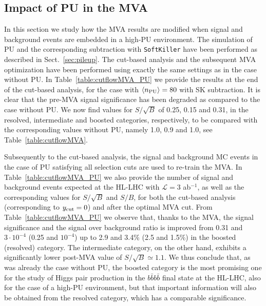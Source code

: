 \subsection{Impact of PU in the MVA}

In this section we study how the MVA results are modified when
signal and background events are embedded in a high-PU environment.
%
The simulation of PU and the corresponding subtraction with
{\tt SoftKiller} have been performed as described
in Sect.~\ref{sec:pileup}.
%
The cut-based analysis and the subsequent
MVA optimization have been performed using exactly the same
settings as in the case without PU.
%
In Table~\ref{table:cutflowMVA_PU} we provide the results
  at the end of the cut-based analysis,
  for the case with $\left\langle n_{\rm PU}\right\rangle=80$ with SK
  subtraction.
%
It is clear that the pre-MVA 
signal significance has been degraded
as compared to the case without PU.
%
We now find values for $S/\sqrt{B}$ of 0.25, 0.15 and 0.31, in the resolved,
intermediate and boosted categories, respectively, to be compared
with the corresponding values without PU, namely 1.0, 0.9 and 1.0,
see Table~\ref{table:cutflowMVA}. 
%

Subsequently to 
 the cut-based analysis, the signal and background
 MC events in the case of PU satisfying all selection cuts
  are used to re-train the MVA.
%
In Table~\ref{table:cutflowMVA_PU}
we also provide  the number of signal and
    background events expected
    at the HL-LHC with $\mathcal{L}=3$ ab$^{-1}$,
    as well as the
    corresponding values for $S/\sqrt{B}$ and $S/B$,
    for both the cut-based analysis (corresponding
    to $y_{\rm cut}=0$) and after the
    optimal MVA cut.
    From Table~\ref{table:cutflowMVA_PU} we observe that, thanks
to the MVA, the signal significance and the
signal over background ratio is improved from 0.31 and $3\cdot 10^{-4}$
(0.25 and $10^{-4}$) up to 2.9 and 3.4\% (2.5 and 1.5\%)
in the boosted (resolved) category.
%
The intermediate category, on the other hand, exhibits a
significantly lower post-MVA value of $S/\sqrt{B}\simeq
1.1$.
%
We thus conclude that, as was already the case
without PU,
the boosted category is the most promising
one for the study of Higgs pair production in the $b\bar{b}b\bar{b}$
final state
at the HL-LHC, also for the case of a high-PU environment, but that
important information will also be obtained from
the resolved category, which has a comparable significance.


